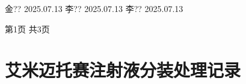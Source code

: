 \documentclass[UTF8,10pt,a4paper,fontset=fandol]{ctexart}
\newcommand{\handwritten}[1]{#1}
\begin{document}
\noindent
\handwritten{金??}\quad
\handwritten{2025.07.13}
\hfill
\handwritten{李??}\quad
\handwritten{2025.07.13}
\hfill
\handwritten{李??}\quad
\handwritten{2025.07.13}

\vfill
\begin{center}
第1页 共3页
\end{center}

\newpage

\section*{艾米迈托赛注射液分装处理记录}
\end{document}
